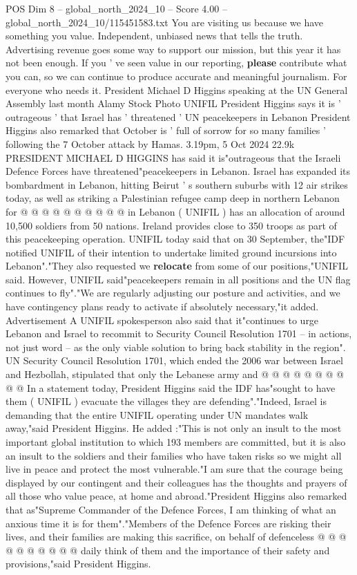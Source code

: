 \begin{textsample}{POS Dim 8 – global\_north\_2024\_10 – Score 4.00 – global\_north\_2024\_10/115451583.txt}  \label{ex:f8_pos_248}
You are visiting us because we have something you value.
Independent, unbiased news that tells the truth.
Advertising revenue goes some way to support our mission, but this year it has not been enough.
If you ' ve seen value in our reporting, \textbf{please} contribute what you can, so we can continue to produce accurate and meaningful journalism.
For everyone who needs it.
President Michael D Higgins speaking at the UN General Assembly last month Alamy Stock Photo UNIFIL President Higgins says it is ' outrageous ' that Israel has ' threatened ' UN peacekeepers in Lebanon President Higgins also remarked that October is ' full of sorrow for so many families ' following the 7 October attack by Hamas. 3.19pm, 5 Oct 2024 22.9k PRESIDENT MICHAEL D HIGGINS has said it is"outrageous that the Israeli Defence Forces have threatened"peacekeepers in Lebanon.
Israel has expanded its bombardment in Lebanon, hitting Beirut ' s southern suburbs with 12 air strikes today, as well as striking a Palestinian refugee camp deep in northern Lebanon for @ @ @ @ @ @ @ @ @ @ in Lebanon ( UNIFIL ) has an allocation of around 10,500 soldiers from 50 nations.
Ireland provides close to 350 troops as part of this peacekeeping operation.
UNIFIL today said that on 30 September, the"IDF notified UNIFIL of their intention to undertake limited ground incursions into Lebanon"."They also requested we \textbf{relocate} from some of our positions,"UNIFIL said.
However, UNIFIL said"peacekeepers remain in all positions and the UN flag continues to fly"."We are regularly adjusting our posture and activities, and we have contingency plans ready to activate if absolutely necessary,"it added.
Advertisement A UNIFIL spokesperson also said that it"continues to urge Lebanon and Israel to recommit to Security Council Resolution 1701 -- in actions, not just word -- as the only viable solution to bring back stability in the region".
UN Security Council Resolution 1701, which ended the 2006 war between Israel and Hezbollah, stipulated that only the Lebanese army and @ @ @ @ @ @ @ @ @ @ In a statement today, President Higgins said the IDF has"sought to have them ( UNIFIL ) evacuate the villages they are defending"."Indeed, Israel is demanding that the entire UNIFIL operating under UN mandates walk away,"said President Higgins.
He added :"This is not only an insult to the most important global institution to which 193 members are committed, but it is also an insult to the soldiers and their families who have taken risks so we might all live in peace and protect the most vulnerable."I am sure that the courage being displayed by our contingent and their colleagues has the thoughts and prayers of all those who value peace, at home and abroad."President Higgins also remarked that as"Supreme Commander of the Defence Forces, I am thinking of what an anxious time it is for them"."Members of the Defence Forces are risking their lives, and their families are making this sacrifice, on behalf of defenceless @ @ @ @ @ @ @ @ @ @ daily think of them and the importance of their safety and provisions,"said President Higgins.

\end{textsample}
